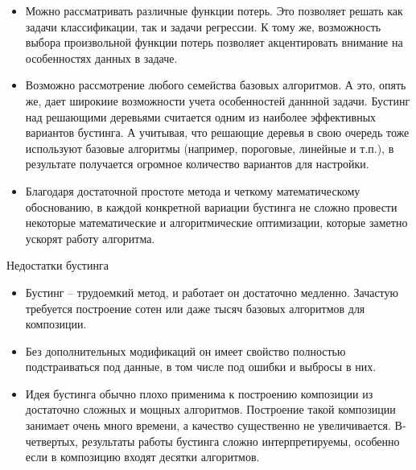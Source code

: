 \begin{itemize}
    \item Можно рассматривать различные функции потерь. Это позволяет решать как задачи классификации, так и задачи регрессии. К тому же, возможность выбора произвольной функции потерь позволяет акцентировать внимание на особенностях данных в задаче.

    \item Возможно рассмотрение любого семейства базовых алгоритмов. А это, опять же, дает широкиие возможности учета особенностей даннной задачи. Бустинг над решающими деревьями считается одним из наиболее эффективных вариантов бустинга. А учитывая, что решающие деревья в свою очередь тоже используют базовые алгоритмы (например, пороговые, линейные и т.п.), в результате получается огромное количество вариантов для настройки.

    \item Благодаря достаточной простоте метода и четкому математическому обоснованию, в каждой конкретной вариации бустинга не сложно провести некоторые математические и алгоритмические оптимизации, которые заметно ускорят работу алгоритма.
\end{itemize}

Недостатки бустинга

\begin{itemize}

\item Бустинг – трудоемкий метод, и работает он достаточно медленно. Зачастую требуется построение сотен или даже тысяч базовых алгоритмов для композиции. 

\item Без дополнительных модификаций он имеет свойство полностью подстраиваться под данные, в том числе под ошибки и выбросы в них.

\item Идея бустинга обычно плохо применима к построению композиции из достаточно сложных и мощных алгоритмов. Построение такой композиции занимает очень много времени, а качество существенно не увеличивается. В-четвертых, результаты работы бустинга сложно интерпретируемы, особенно если в композицию входят десятки алгоритмов.

\end{itemize}

\newpage